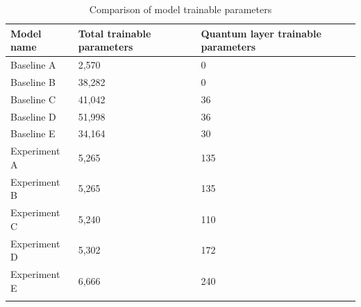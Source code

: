 \begin{table}[h]
\caption{Comparison of model trainable parameters}\label{tab2}%
\begin{tabular}{@{}lll@{}}
\toprule
Model name  & Total trainable parameters & Quantum layer trainable parameters \\
\midrule
Baseline A & 2,570 & 0 \\
Baseline B & 38,282 & 0 \\
Baseline C & 41,042 & 36 \\
Baseline D & 51,998 & 36 \\
Baseline E & 34,164 & 30 \\
Experiment A & 5,265 & 135 \\
Experiment B & 5,265 & 135 \\
Experiment C & 5,240 & 110 \\
Experiment D & 5,302 & 172 \\
Experiment E & 6,666 & 240 \\
\botrule
\end{tabular}
\end{table}
